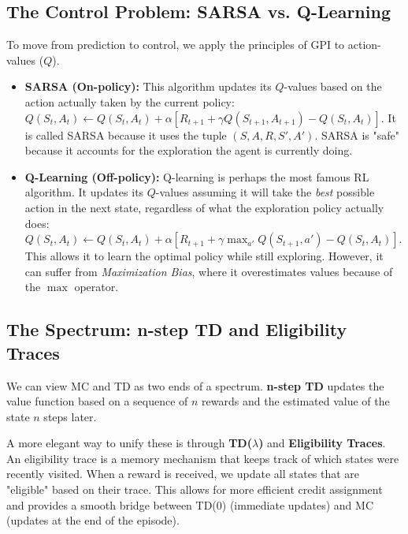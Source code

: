 \subsection{The Control Problem: SARSA vs. Q-Learning}
To move from prediction to control, we apply the principles of GPI to action-values ($Q$).
\begin{itemize}
    \item \textbf{SARSA (On-policy):} This algorithm updates its $Q$-values based on the action actually taken by the current policy: $Q(S_t, A_t) \leftarrow Q(S_t, A_t) + \alpha [R_{t+1} + \gamma Q(S_{t+1}, A_{t+1}) - Q(S_t, A_t)]$. It is called SARSA because it uses the tuple $(S, A, R, S', A')$. SARSA is "safe" because it accounts for the exploration the agent is currently doing.
    \item \textbf{Q-Learning (Off-policy):} Q-learning is perhaps the most famous RL algorithm. It updates its $Q$-values assuming it will take the \textit{best} possible action in the next state, regardless of what the exploration policy actually does: $Q(S_t, A_t) \leftarrow Q(S_t, A_t) + \alpha [R_{t+1} + \gamma \max_{a'} Q(S_{t+1}, a') - Q(S_t, A_t)]$. This allows it to learn the optimal policy while still exploring. However, it can suffer from \textit{Maximization Bias}, where it overestimates values because of the $\max$ operator.
\end{itemize}

\subsection{The Spectrum: n-step TD and Eligibility Traces}
We can view MC and TD as two ends of a spectrum. \textbf{n-step TD} updates the value function based on a sequence of $n$ rewards and the estimated value of the state $n$ steps later. 

A more elegant way to unify these is through \textbf{TD($\lambda$)} and \textbf{Eligibility Traces}. An eligibility trace is a memory mechanism that keeps track of which states were recently visited. When a reward is received, we update all states that are "eligible" based on their trace. This allows for more efficient credit assignment and provides a smooth bridge between TD(0) (immediate updates) and MC (updates at the end of the episode).
